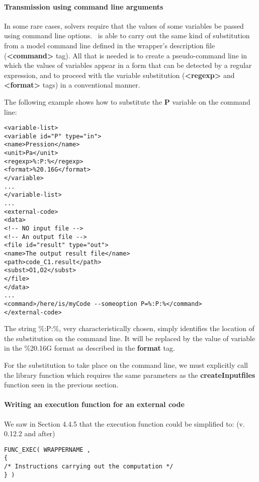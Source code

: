 \paragraph{Transmission using command line arguments}

In some rare cases, solvers require that the values of some variables be passed using command line options. \OT\ is able to carry out the same kind of substitution from a model command line defined in the wrapper's description file ({\bf <command>} tag). All that is needed is to create a pseudo-command line in which the values of variables appear in a form that can be detected by a regular expression, and to proceed with the variable substitution ({\bf <regexp>} and {\bf <format>} tags) in a conventional manner.

The following example shows how to substitute the {\bf P} variable on the command line:

\lstset{language=XML, basicstyle=\normalsize}
\begin{lstlisting}[frame=TBRL]
<variable-list>
<variable id="P" type="in">
<name>Pression</name>
<unit>Pa</unit>
<regexp>%:P:%</regexp>
<format>%20.16G</format>
</variable>
...
</variable-list>
...
<external-code>
<data>
<!-- NO input file -->
<!-- An output file -->
<file id="result" type="out">
<name>The output result file</name>
<path>code_C1.result</path>
<subst>O1,O2</subst>
</file>
</data>
...
<command>/here/is/myCode --someoption P=%:P:%</command>
</external-code>
\end{lstlisting}

The string \%:P:\%, very characteristically chosen, simply identifies the location of the substitution on the command line. It will be replaced by the value of variable in the \%20.16G format as described in the {\bf format} tag.

For the substitution to take place on the command line, we must explicitly call the library function  which requires the same parameters as the {\bf createInputfiles} function seen in the previous section.

\paragraph{Writing an execution function for an external code}

We saw in Section 4.4.5 that the execution function could be simplified to: (v. 0.12.2 and after)
\lstset{language=C++, basicstyle=\normalsize}
\begin{lstlisting}[frame=TBRL]
FUNC_EXEC( WRAPPERNAME ,
{
/* Instructions carrying out the computation */
} )
\end{lstlisting}

